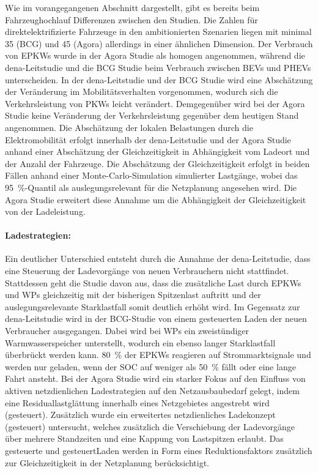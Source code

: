 Wie im vorangegangenen Abschnitt dargestellt, gibt es bereits beim Fahrzeughochlauf Differenzen zwischen den Studien.
Die Zahlen für direktelektrifizierte Fahrzeuge in den ambitionierten Szenarien liegen mit minimal \SI{35}{\MioFZs} (BCG) und \SI{45}{\MioFZs} (Agora) allerdings in einer ähnlichen Dimension.
Der Verbrauch von \glspl{EPKW} wurde in der Agora Studie als homogen angenommen, während die dena-Leitstudie und die BCG Studie beim Verbrauch zwischen \glspl{BEV} und \glspl{PHEV} unterscheiden.
In der dena-Leitstudie und der BCG Studie wird eine Abschätzung der Veränderung im Mobilitätsverhalten vorgenommen, wodurch sich die Verkehrsleistung von \glspl{PKW} leicht verändert.
Demgegenüber wird bei der Agora Studie keine Veränderung der Verkehrsleistung gegenüber dem heutigen Stand angenommen.
Die Abschätzung der lokalen Belastungen durch die Elektromobilität erfolgt innerhalb der dena-Leitstudie und der Agora Studie anhand einer Abschätzung der Gleichzeitigkeit in Abhängigkeit vom Ladeort und der Anzahl der Fahrzeuge.
Die Abschätzung der Gleichzeitigkeit erfolgt in beiden Fällen anhand einer Monte-Carlo-Simulation simulierter Lastgänge, wobei das \SI{95}{\percent}-Quantil als auslegungsrelevant für die Netzplanung angesehen wird.
Die Agora Studie erweitert diese Annahme um die Abhängigkeit der Gleichzeitigkeit von der Ladeleistung.


\paragraph{Ladestrategien:}

Ein deutlicher Unterschied entsteht durch die Annahme der dena-Leitstudie, dass eine Steuerung der Ladevorgänge von neuen Verbrauchern nicht stattfindet.
Stattdessen geht die Studie davon aus, dass die zusätzliche Last durch \glspl{EPKW} und \glspl{WP} gleichzeitig mit der bisherigen Spitzenlast auftritt und der auslegungsrelevante Starklastfall somit deutlich erhöht wird.
Im Gegensatz zur dena-Leitstudie wird in der BCG-Studie von einem gesteuerten Laden der neuen Verbraucher ausgegangen.
Dabei wird bei \glspl{WP} ein zweistündiger Warmwasserspeicher unterstellt, wodurch ein ebenso langer Starklastfall überbrückt werden kann.
\SI{80}{\percent} der \glspl{EPKW} reagieren auf Strommarktsignale und werden nur geladen, wenn der \gls{SOC} auf weniger als \SI{50}{\percent} fällt oder eine lange Fahrt ansteht.
Bei der Agora Studie wird ein starker Fokus auf den Einfluss von aktiven netzdienlichen Ladestrategien auf den Netzausbaubedarf gelegt, indem eine Residuallastglättung innerhalb eines Netzgebietes angestrebt wird (gesteuert).
Zusätzlich wurde ein erweitertes netzdienliches Ladekonzept (gesteuert\Plus) untersucht, welches zusätzlich die Verschiebung der Ladevorgänge über mehrere Standzeiten und eine Kappung von Lastspitzen erlaubt.
Das gesteuerte und gesteuert\Plus Laden werden in Form eines Reduktionsfaktors zusätzlich zur Gleichzeitigkeit in der Netzplanung berücksichtigt.


